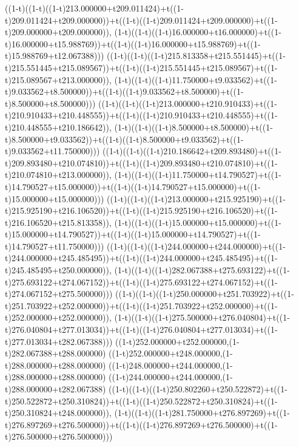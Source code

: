 ((1-t)((1-t)((1-t)213.000000+t209.011424)+t((1-t)209.011424+t209.000000))+t((1-t)((1-t)209.011424+t209.000000)+t((1-t)209.000000+t209.000000)),                                     (1-t)((1-t)((1-t)16.000000+t16.000000)+t((1-t)16.000000+t15.988769))+t((1-t)((1-t)16.000000+t15.988769)+t((1-t)15.988769+t12.067388)))
((1-t)((1-t)((1-t)215.813358+t215.551445)+t((1-t)215.551445+t215.089567))+t((1-t)((1-t)215.551445+t215.089567)+t((1-t)215.089567+t213.000000)),                                     (1-t)((1-t)((1-t)11.750000+t9.033562)+t((1-t)9.033562+t8.500000))+t((1-t)((1-t)9.033562+t8.500000)+t((1-t)8.500000+t8.500000)))
((1-t)((1-t)((1-t)213.000000+t210.910433)+t((1-t)210.910433+t210.448555))+t((1-t)((1-t)210.910433+t210.448555)+t((1-t)210.448555+t210.186642)),                                     (1-t)((1-t)((1-t)8.500000+t8.500000)+t((1-t)8.500000+t9.033562))+t((1-t)((1-t)8.500000+t9.033562)+t((1-t)9.033562+t11.750000)))
((1-t)((1-t)((1-t)210.186642+t209.893480)+t((1-t)209.893480+t210.074810))+t((1-t)((1-t)209.893480+t210.074810)+t((1-t)210.074810+t213.000000)),                                     (1-t)((1-t)((1-t)11.750000+t14.790527)+t((1-t)14.790527+t15.000000))+t((1-t)((1-t)14.790527+t15.000000)+t((1-t)15.000000+t15.000000)))
((1-t)((1-t)((1-t)213.000000+t215.925190)+t((1-t)215.925190+t216.106520))+t((1-t)((1-t)215.925190+t216.106520)+t((1-t)216.106520+t215.813358)),                                     (1-t)((1-t)((1-t)15.000000+t15.000000)+t((1-t)15.000000+t14.790527))+t((1-t)((1-t)15.000000+t14.790527)+t((1-t)14.790527+t11.750000)))
((1-t)((1-t)((1-t)244.000000+t244.000000)+t((1-t)244.000000+t245.485495))+t((1-t)((1-t)244.000000+t245.485495)+t((1-t)245.485495+t250.000000)),                                     (1-t)((1-t)((1-t)282.067388+t275.693122)+t((1-t)275.693122+t274.067152))+t((1-t)((1-t)275.693122+t274.067152)+t((1-t)274.067152+t275.500000)))
((1-t)((1-t)((1-t)250.000000+t251.703922)+t((1-t)251.703922+t252.000000))+t((1-t)((1-t)251.703922+t252.000000)+t((1-t)252.000000+t252.000000)),                                     (1-t)((1-t)((1-t)275.500000+t276.040804)+t((1-t)276.040804+t277.013034))+t((1-t)((1-t)276.040804+t277.013034)+t((1-t)277.013034+t282.067388)))
((1-t)252.000000+t252.000000,(1-t)282.067388+t288.000000)
((1-t)252.000000+t248.000000,(1-t)288.000000+t288.000000)
((1-t)248.000000+t244.000000,(1-t)288.000000+t288.000000)
((1-t)244.000000+t244.000000,(1-t)288.000000+t282.067388)
((1-t)((1-t)((1-t)250.802260+t250.522872)+t((1-t)250.522872+t250.310824))+t((1-t)((1-t)250.522872+t250.310824)+t((1-t)250.310824+t248.000000)),                                     (1-t)((1-t)((1-t)281.750000+t276.897269)+t((1-t)276.897269+t276.500000))+t((1-t)((1-t)276.897269+t276.500000)+t((1-t)276.500000+t276.500000)))
